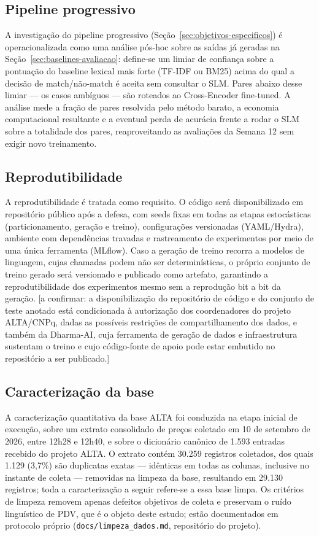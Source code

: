\documentclass[
    article,
    12pt,
    oneside,
    a4paper,
    english,
    brazilian
    ]{abntex2}
\numberwithin{equation}{section}
\begin{document}
\subsection{Pipeline progressivo}

A investigação do pipeline progressivo (Seção~\ref{sec:objetivos-especificos}) é operacionalizada como uma análise pós-hoc sobre as saídas já geradas na Seção~\ref{sec:baselines-avaliacao}: define-se um limiar de confiança sobre a pontuação do baseline lexical mais forte (TF-IDF ou BM25) acima do qual a decisão de match/não-match é aceita sem consultar o SLM. Pares abaixo desse limiar --- os casos ambíguos --- são roteados ao Cross-Encoder fine-tuned. A análise mede a fração de pares resolvida pelo método barato, a economia computacional resultante e a eventual perda de acurácia frente a rodar o SLM sobre a totalidade dos pares, reaproveitando as avaliações da Semana 12 sem exigir novo treinamento.

\subsection{Reprodutibilidade}

A reprodutibilidade é tratada como requisito. O código será disponibilizado em repositório público após a defesa, com seeds fixas em todas as etapas estocásticas (particionamento, geração e treino), configurações versionadas (YAML/Hydra), ambiente com dependências travadas e rastreamento de experimentos por meio de uma única ferramenta (MLflow). Caso a geração de treino recorra a modelos de linguagem, cujas chamadas podem não ser determinísticas, o próprio conjunto de treino gerado será versionado e publicado como artefato, garantindo a reprodutibilidade dos experimentos mesmo sem a reprodução bit a bit da geração. [a confirmar: a disponibilização do repositório de código e do conjunto de teste anotado está condicionada à autorização dos coordenadores do projeto ALTA/CNPq, dadas as possíveis restrições de compartilhamento dos dados, e também da Dharma-AI, cuja ferramenta de geração de dados e infraestrutura sustentam o treino e cujo código-fonte de apoio pode estar embutido no repositório a ser publicado.]

\subsection{Caracterização da base}
\label{sec:caracterizacao-base}

A caracterização quantitativa da base ALTA foi conduzida na etapa inicial de execução, sobre um extrato consolidado de preços coletado em 10 de setembro de 2026, entre 12h28 e 12h40, e sobre o dicionário canônico de 1.593 entradas recebido do projeto ALTA. O extrato contém 30.259 registros coletados, dos quais 1.129 (3,7\%) são duplicatas exatas --- idênticas em todas as colunas, inclusive no instante de coleta --- removidas na limpeza da base, resultando em 29.130 registros; toda a caracterização a seguir refere-se a essa base limpa. Os critérios de limpeza removem apenas defeitos objetivos de coleta e preservam o ruído linguístico de PDV, que é o objeto deste estudo; estão documentados em protocolo próprio (\texttt{docs/limpeza\_dados.md}, repositório do projeto).
\end{document}
